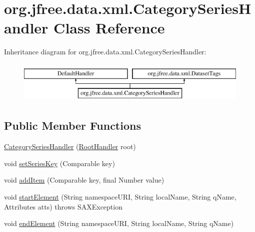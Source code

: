 \hypertarget{classorg_1_1jfree_1_1data_1_1xml_1_1_category_series_handler}{}\section{org.\+jfree.\+data.\+xml.\+Category\+Series\+Handler Class Reference}
\label{classorg_1_1jfree_1_1data_1_1xml_1_1_category_series_handler}
Inheritance diagram for org.\+jfree.\+data.\+xml.\+Category\+Series\+Handler\+:\begin{figure}[H]
\begin{center}
\leavevmode
\includegraphics[height=2.000000cm]{classorg_1_1jfree_1_1data_1_1xml_1_1_category_series_handler}
\end{center}
\end{figure}
\subsection*{Public Member Functions}
\begin{DoxyCompactItemize}
\item 
\mbox{\hyperlink{classorg_1_1jfree_1_1data_1_1xml_1_1_category_series_handler_a7c631634a1620eea8313b3ce17350f7a}{Category\+Series\+Handler}} (\mbox{\hyperlink{classorg_1_1jfree_1_1data_1_1xml_1_1_root_handler}{Root\+Handler}} root)
\item 
void \mbox{\hyperlink{classorg_1_1jfree_1_1data_1_1xml_1_1_category_series_handler_a0dc622ef3c4b064d1726e6c739a731d7}{set\+Series\+Key}} (Comparable key)
\item 
void \mbox{\hyperlink{classorg_1_1jfree_1_1data_1_1xml_1_1_category_series_handler_ae65439d506fdbe7f69e53fb43d51ddbf}{add\+Item}} (Comparable key, final Number value)
\item 
void \mbox{\hyperlink{classorg_1_1jfree_1_1data_1_1xml_1_1_category_series_handler_a917c545a54e3815dcee9a7f0cbb50e87}{start\+Element}} (String namespace\+U\+RI, String local\+Name, String q\+Name, Attributes atts)  throws S\+A\+X\+Exception 
\item 
void \mbox{\hyperlink{classorg_1_1jfree_1_1data_1_1xml_1_1_category_series_handler_a896b45a06a498bbe4cc8d752b2fd7738}{end\+Element}} (String namespace\+U\+RI, String local\+Name, String q\+Name)
\end{DoxyCompactItemize}
